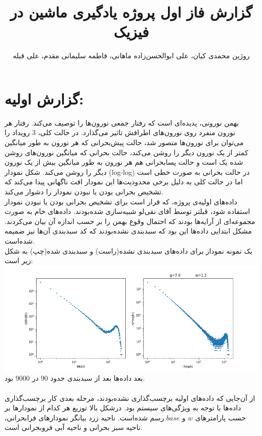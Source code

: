\documentclass[12pt]{article}
\title{گزارش فاز اول پروژه یادگیری ماشین در فیزیک}
\author{روژین محمدی کیان، علی ابوالحسن‌زاده ماهانی، فاطمه سلیمانی مقدم، علی قبله}
\begin{document}
\maketitle
\section{گزارش اولیه:}
بهمن نورونی، پدیده‌ای است که رفتار جمعی نورون‌ها را توصیف می‌کند. رفتار هر نورون منفرد روی نورون‌های اطرافش تاثیر می‌گذارد. در حالت کلی، 3 رویداد را می‌توان برای نورون‌ها متصور شد، حالت پیش‌بحرانی که هر نورون به طور میانگین کمتر از یک نورون دیگر را روشن می‌کند، حالت بحرانی که میانگین نورون‌های روشن شده یک است و حالت پسابحرانی هم هر نورون به طور میانگین بیش از یک نورون دیگر را روشن می‌کند.
شکل نمودار (log-log) در حالت بحرانی به صورت خطی است اما در حالت کلی به دلیل برخی محدودیت‌ها این نمودار افت ناگهانی پیدا می‌‌کند که تشخیص بحرانی بودن یا نبودن نمودار را دشوار می‌کند.
\\
داده‌های اولیه‌ی پروژه، که قرار است برای تشخیص بحرانی بودن یا نبودن نمودار استفاده شود، قبلتر توسط آقای نقی‌لو شبیه‌سازی شده‌بودند. داده‌های خام به صورت مجموعه‌ای از آرایه‌ها بودند که احتمال وقوع بهمن را بر حسب اندازه آن بیان می‌کردند. مشکل ابتدایی داده‌ها این بود که سبدبندی نشده‌بودند که کد سبدبندی آن‌ها نیز ضمیمه شده‌است.
\\
یک نمونه نمودار برای داده‌های سبدبندی نشده(راست) و سبدبندی شده(چپ) به شکل زیر است:
\\
\includegraphics[scale=0.5]{g7.0 w1.2 base1 P}
\\
بعد داده‌ها بعد از سبدبندی حدود 90 در 9000 بود.
\\
\\
از آن‌جایی که داده‌های اولیه برچسب‌گذاری نشده‌بودند، مرحله بعدی کار برچسب‌گذاری داده‌ها با توجه به ویژگی‌های سیستم بود. درشکل بالا توزیع هر کدام از نمودارها بر حسب پارامترهای $w$ و $base$ رسم شده‌است. ناحیه زرد بیانگر نمودارهای فرابحرانی، ناحیه سبز بحرانی و ناحیه آبی فروبحرانی است.
\\
\end{document}
